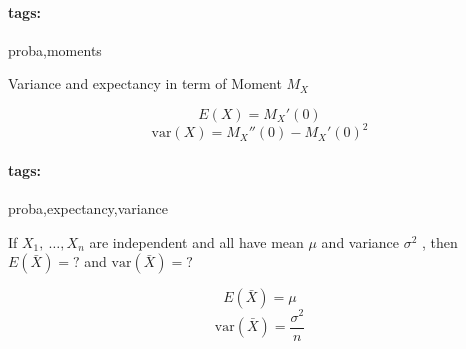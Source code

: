 \documentclass[12pt]{article}
\newcommand*{\xfield}[1]{\begin{mdframed}\centering #1\end{mdframed}\bigskip}
\newenvironment{note}{}{}
\newcommand*{\tags}[1]{\paragraph{tags: }#1}
\begin{document}
\begin{note}
	\tags{proba,moments}
	\xfield{Variance and expectancy in term of Moment $M_X$}
	\xfield{$$E(X) = M_X'(0)$$
$$\text{var}(X) = M_X''(0)-M_X'(0)^2$$}
\end{note}

\begin{note}
	\tags{proba,expectancy,variance}
	\xfield{If $X_1,\ \hdots, X_n$ are independent and all have mean $\mu$ and
    variance $\sigma^2$ , then $E(\bar{X}) = ?$ and $\text{var}(\bar{X})= ?$}
	\xfield{$$E(\bar{X}) = \mu$$
$$\text{var}(\bar{X}) = \frac{\sigma^2}{n}$$}
\end{note}
\end{document}
